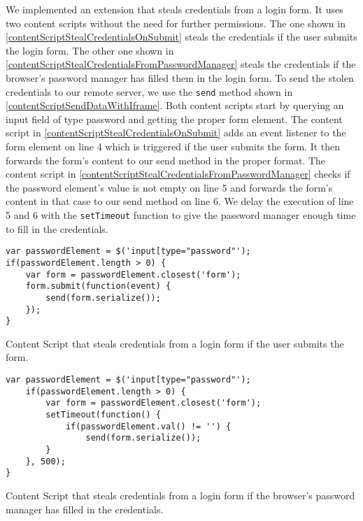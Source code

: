 	We implemented an extension that steals credentials from a login form. It uses two content scripts without the need for further permissions. The one shown in \autoref{contentScriptStealCredentialsOnSubmit} steals the credentials if the user submits the login form. The other one shown in \autoref{contentScriptStealCredentialsFromPasswordManager} steals the credentials if the browser's password manager has filled them in the login form. To send the stolen credentials to our remote server, we use the \texttt{send} method shown in \autoref{contentScriptSendDataWithIframe}. Both content scripts start by querying an input field of type password and getting the proper form element. The content script in \autoref{contentScriptStealCredentialsOnSubmit} adds an event listener to the form element on line 4 which is triggered if the user submits the form. It then forwards the form's content to our send method in the proper format. The content script in \autoref{contentScriptStealCredentialsFromPasswordManager} checks if the password element's value is not empty on line 5 and forwards the form's content in that case to our send method on line 6. We delay the execution of line 5 and 6 with the \texttt{setTimeout} function to give the password manager enough time to fill in the credentials. \\
	
	\begin{code}
		\begin{lstlisting}	
var passwordElement = $('input[type="password"');
if(passwordElement.length > 0) {
	var form = passwordElement.closest('form');
	form.submit(function(event) {
		send(form.serialize());
	});
}
\end{lstlisting}
		\caption{Content Script that steals credentials from a login form if the user submits the form.}
		\label{contentScriptStealCredentialsOnSubmit}
	\end{code}
	
	\begin{code}
		\begin{lstlisting}
var passwordElement = $('input[type="password"');
	if(passwordElement.length > 0) {
		var form = passwordElement.closest('form');
		setTimeout(function() {
			if(passwordElement.val() != '') {
				send(form.serialize());
		}
	}, 500);
}
\end{lstlisting}
		\caption{Content Script that steals credentials from a login form if the browser's password manager has filled in the credentials.}
		\label{contentScriptStealCredentialsFromPasswordManager}
	\end{code}
	
